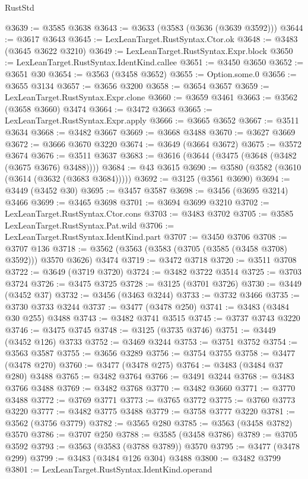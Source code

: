 \begin{lexlean}{RustStd}
\begin{coremodule}
{\begin{coremodule}
{{{{{{{{{{{{{{{{{{{{{{{{{{{{{{{{{{{{{{{{{{{{{@3639 := @3585 @3638
@3643 := @3633 (@3583 (@3636 (@3639 @3592)))
@3644 := @3617 @3643
@3645 := LexLeanTarget.RustSyntax.Ctor.ok
@3648 := @3483 (@3645 @3622 @3210)
@3649 := LexLeanTarget.RustSyntax.Expr.block
@3650 := LexLeanTarget.RustSyntax.IdentKind.callee
@3651 := @3450 @3650
@3652 := @3651 @30
@3654 := @3563 (@3458 @3652)
@3655 := Option.some.{0}
@3656 := @3655 @3134
@3657 := @3656 @3200
@3658 := @3654 @3657
@3659 := LexLeanTarget.RustSyntax.Expr.clone
@3660 := @3659 @3461
@3663 := @3562 (@3658 @3660) @3474
@3664 := @3472 @3663
@3665 := LexLeanTarget.RustSyntax.Expr.apply
@3666 := @3665 @3652
@3667 := @3511 @3634
@3668 := @3482 @3667
@3669 := @3668 @3488
@3670 := @3627 @3669
@3672 := @3666 @3670 @3220
@3674 := @3649 (@3664 @3672)
@3675 := @3572 @3674
@3676 := @3511 @3637
@3683 := @3616 (@3644 (@3475 (@3648 (@3482 (@3675 @3676) @3488))))
@3684 := @43 @3615
@3690 := @3580 (@3582 (@3610 (@3614 (@3632 (@3683 @3684)))))
@3692 := @3125 (@3561 @3690)
@3694 := @3449 (@3452 @30)
@3695 := @3457 @3587
@3698 := @3456 (@3695 @3214) @3466
@3699 := @3465 @3698
@3701 := @3694 @3699 @3210
@3702 := LexLeanTarget.RustSyntax.Ctor.cons
@3703 := @3483 @3702
@3705 := @3585 LexLeanTarget.RustSyntax.Pat.wild
@3706 := LexLeanTarget.RustSyntax.IdentKind.part
@3707 := @3450 @3706
@3708 := @3707 @136
@3718 := @3562 (@3563 (@3583 (@3705 (@3585 (@3458 @3708) @3592))) @3570 @3626) @3474
@3719 := @3472 @3718
@3720 := @3511 @3708
@3722 := @3649 (@3719 @3720)
@3724 := @3482 @3722 @3514
@3725 := @3703 @3724
@3726 := @3475 @3725
@3728 := @3125 (@3701 @3726)
@3730 := @3449 (@3452 @37)
@3732 := @3456 (@3463 @3244)
@3733 := @3732 @3466
@3735 := @3730 @3733 @3244
@3737 := @3477 (@3478 @250)
@3741 := @3483 (@3484 @30 @255) @3488
@3743 := @3482 @3741 @3515
@3745 := @3737 @3743 @3220
@3746 := @3475 @3745
@3748 := @3125 (@3735 @3746)
@3751 := @3449 (@3452 @126) @3733
@3752 := @3469 @3244
@3753 := @3751 @3752
@3754 := @3563 @3587
@3755 := @3656 @3289
@3756 := @3754 @3755
@3758 := @3477 (@3478 @270)
@3760 := @3477 (@3478 @275)
@3764 := @3483 (@3484 @37 @280) @3488
@3765 := @3482 @3764
@3766 := @3491 @3244
@3768 := @3483 @3766 @3488
@3769 := @3482 @3768
@3770 := @3482 @3660
@3771 := @3770 @3488
@3772 := @3769 @3771
@3773 := @3765 @3772
@3775 := @3760 @3773 @3220
@3777 := @3482 @3775 @3488
@3779 := @3758 @3777 @3220
@3781 := @3562 (@3756 @3779)
@3782 := @3565 @280
@3785 := @3563 (@3458 @3782) @3570
@3786 := @3707 @250
@3788 := @3585 (@3458 @3786)
@3789 := @3705 @3592
@3793 := @3563 (@3583 (@3788 @3789)) @3570
@3795 := @3477 (@3478 @299)
@3799 := @3483 (@3484 @126 @304) @3488
@3800 := @3482 @3799
@3801 := LexLeanTarget.RustSyntax.IdentKind.operand
}}}}}}}}}}}}}}}}}}}}}}}}}}}}}}}}}}}}}}}}}}}}}
\end{coremodule}}
\end{coremodule}
\end{lexlean}
